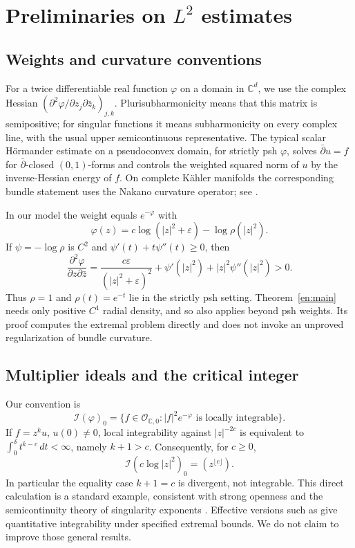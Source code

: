 \documentclass[12pt]{amsart}
\theoremstyle{definition}
\theoremstyle{remark}
\numberwithin{equation}{section}
\newcommand{\cI}{\mathcal{I}}
\newcommand{\cO}{\mathcal{O}}
\newcommand{\C}{\mathbb{C}}
\theoremstyle{definition}
\begin{document}
\section{Preliminaries on \texorpdfstring{$L^2$}{L2} estimates}
\subsection{Weights and curvature conventions}
For a twice differentiable real function $\varphi$ on a domain in
$\C^d$, we use the complex Hessian
$(\partial^2\varphi/\partial z_j\partial\bar z_k)_{j,k}$.
Plurisubharmonicity means that this matrix is semipositive; for singular
functions it means subharmonicity on every complex line, with the usual
upper semicontinuous representative. The typical scalar H\"ormander
estimate on a pseudoconvex domain, for strictly psh $\varphi$, solves
$\bar\partial u=f$ for $\bar\partial$-closed $(0,1)$-forms and controls
the weighted squared norm of $u$ by the inverse-Hessian energy of $f$.
On complete K\"ahler manifolds the corresponding bundle statement uses
the Nakano curvature operator; see \cite{H65,D82}.

In our model the weight equals $e^{-\varphi}$ with
\begin{equation}\label{en:psh}
 \varphi(z)=c\log(|z|^2+\varepsilon)-\log\rho(|z|^2).
\end{equation}
If $\psi=-\log\rho$ is $C^2$ and
$\psi'(t)+t\psi''(t)\ge0$, then
\begin{equation}\label{en:hessian}
 \frac{\partial^2\varphi}{\partial z\partial\bar z}
 =\frac{c\varepsilon}{(|z|^2+\varepsilon)^2}
  +\psi'(|z|^2)+|z|^2\psi''(|z|^2)>0.
\end{equation}
Thus $\rho=1$ and $\rho(t)=e^{-t}$ lie in the strictly psh setting.
Theorem~\ref{en:main} needs only positive $C^1$ radial density, and so
also applies beyond psh weights. Its proof computes the extremal
problem directly and does not invoke an unproved regularization of
bundle curvature.

\subsection{Multiplier ideals and the critical integer}
Our convention is
\[
 \cI(\varphi)_0
 =\{f\in\cO_{\C,0}: |f|^2e^{-\varphi}\text{ is locally integrable}\}.
\]
If $f=z^ku$, $u(0)\ne0$, local integrability against $|z|^{-2c}$ is
equivalent to $\int_0^\delta t^{k-c}\,dt<\infty$, namely $k+1>c$.
Consequently, for $c\ge0$,
\begin{equation}\label{en:ideal}
 \cI(c\log|z|^2)_0=(z^{\lfloor c\rfloor}).
\end{equation}
In particular the equality case $k+1=c$ is divergent, not integrable.
This direct calculation is a standard example, consistent with strong
openness \cite{GZSO} and the semicontinuity theory of singularity
exponents \cite{DK01}. Effective versions such as \cite{GY22} give
quantitative integrability under specified extremal bounds. We do not
claim to improve those general results.
\end{document}
